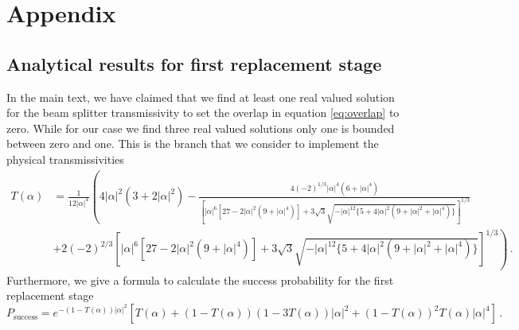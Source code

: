 \documentclass[aps,prl,twocolumn, superscriptaddress]{revtex4-1}
\begin{document}
\section{Appendix}
%
\subsection{Analytical results for first replacement stage}
%
In the main text, we have claimed that we find at least one real valued solution for the beam splitter transmissivity to set the overlap in equation \eqref{eq:overlap} to zero. While for our case we find three real valued solutions only one is bounded between zero and one. This is the branch that we consider to implement the physical transmissivities
%
\begin{equation}
\nonumber
\begin{aligned}
T(\alpha)&=\frac{1}{12|\alpha|^4}\left(4|\alpha|^2(3+2|\alpha|^2)-\frac{4(-2)^{1/3}|\alpha|^4(6+|\alpha|^4)}{\left[|\alpha|^6[27-2|\alpha|^2(9+|\alpha|^4)]+3\sqrt{3}\sqrt{-|\alpha|^{12}\{5+4|\alpha|^2(9+|\alpha|^2+|\alpha|^4)\}}\right]^{1/3}}\right.\\
&+\left.2(-2)^{2/3}\left[|\alpha|^6[27-2|\alpha|^2(9+|\alpha|^4)]+3\sqrt{3}\sqrt{-|\alpha|^{12}\{5+4|\alpha|^2(9+|\alpha|^2+|\alpha|^4)\}}\right]^{1/3}\right)\, .
\end{aligned}
\end{equation}
%
Furthermore, we give a formula to calculate the success probability for the first replacement stage
%
\begin{equation}
\nonumber
P_\mathrm{success}=e^{-(1-T(\alpha))|\alpha|^2} \left[T(\alpha)+(1-T(\alpha))(1-3T(\alpha))|\alpha|^2+(1-T(\alpha))^2T(\alpha) |\alpha|^4\right]\, .
\end{equation}
%
\end{document}
